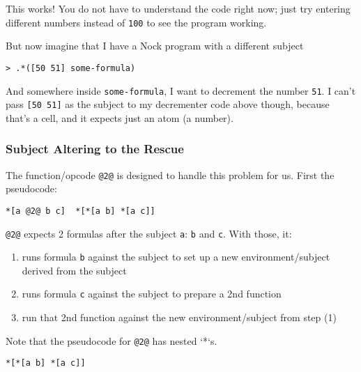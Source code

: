 \documentclass[twoside]{article}
\begin{document}
\noindent
This works! You do not have to understand the code right now; just try entering different numbers instead of \lstinline[style=inlinecode]{100} to see the program working.

But now imagine that I have a Nock program with a different subject

\begin{lstlisting}[style=listingblock]
> .*([50 51] some-formula)
\end{lstlisting}

And somewhere inside \lstinline[style=inlinecode]{some-formula}, I want to decrement the number \lstinline[style=inlinecode]{51}. I can't pass \lstinline[style=inlinecode]{[50 51]} as the subject to my decrementer code above though, because that's a cell, and it expects just an atom (a number).

\subsubsection{Subject Altering to the Rescue}

The function/opcode \lstinline[style=inlinecode]{@2@} is designed to handle this problem for us. First the pseudocode:

\begin{lstlisting}[style=listingcode]
*[a @2@ b c]  *[*[a b] *[a c]]
\end{lstlisting}

\lstinline[style=inlinecode]{@2@} expects 2 formulas after the subject \lstinline[style=inlinecode]{a}: \lstinline[style=inlinecode]{b} and \lstinline[style=inlinecode]{c}. With those, it:

\begin{enumerate}
  \item  runs formula \lstinline[style=inlinecode]{b} against the subject to set up a new environment/subject derived from the subject
  \item  runs formula \lstinline[style=inlinecode]{c} against the subject to prepare a 2nd function
  \item  run that 2nd function against the new environment/subject from step (1)
\end{enumerate}

Note that the pseudocode for \lstinline[style=inlinecode]{@2@} has nested `*`s.

\begin{lstlisting}[style=listingblock]
*[*[a b] *[a c]]
\end{lstlisting}
\end{document}
